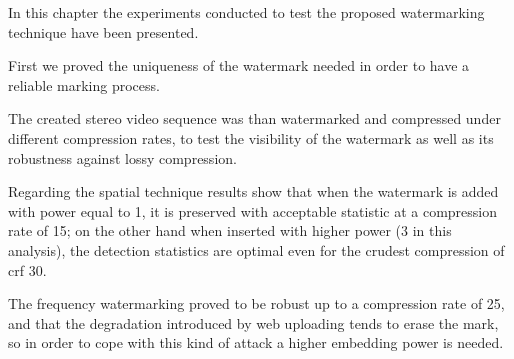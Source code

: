 In this chapter the experiments conducted to test the proposed watermarking technique have been presented.

First we proved the uniqueness of the watermark needed in order to have a reliable marking process.

The created stereo video sequence was than watermarked and compressed under different compression rates, to test the visibility of the watermark as well as its robustness against lossy compression.

Regarding the spatial technique results show that when the watermark is added with power equal to 1, it is preserved with acceptable statistic at a compression rate of 15; on the other hand when inserted with higher power (3 in this analysis), the detection statistics are optimal even for the crudest compression of crf 30. 

The frequency watermarking proved to be robust up to a compression rate of 25, and that the degradation introduced by web uploading tends to erase the mark, so in order to cope with this kind of attack a higher embedding power is needed.  

\begin{table}[htbp]
 
 \begin{center}
 \caption{\label{tab:}}
 \end{center}
 \end{table}

\begin{table}[htbp]
 
 \begin{center}
 \caption{\label{tab:}}
 \end{center}
 \end{table}


